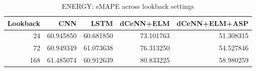 \begin{table}
\caption{ENERGY: sMAPE across lookback settings}
\begin{tabular}{rrrrr}
\toprule
Lookback & CNN & LSTM & dCeNN+ELM & dCeNN+ELM+ASP \\
\midrule
24 & 60.945850 & 60.681850 & 73.101763 & 51.308315 \\
72 & 60.949349 & 61.073638 & 76.313250 & 54.527846 \\
168 & 61.485074 & 60.912639 & 80.833225 & 58.980259 \\
\bottomrule
\end{tabular}
\end{table}
